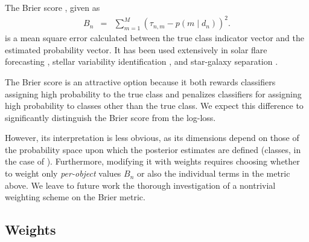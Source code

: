 The Brier score \cite{brier_verification_1950}, given as
\begin{eqnarray}
  \label{eq:brier}
B_{n} &=& \sum_{m=1}^{M}(\tau_{n, m}-p(m \mid d_{n}))^{2}.
\end{eqnarray}
is a mean square error calculated between the true class indicator vector and the estimated probability vector.
It has been used extensively in solar flare forecasting \cite{crown_validation, mays_ensemble_2015, florios_forecasting_2018}, stellar variability identification \citep{richards_construction_2012, armstrong_k2_2016}, and star-galaxy separation \citep{kim_hybrid_2015}.

The Brier score is an attractive option because it both rewards classifiers assigning high probability to the true class and penalizes classifiers for assigning high probability to classes other than the true class.
We expect this difference to significantly distinguish the Brier score from the log-loss.

However, its interpretation is less obvious, as its dimensions depend on those of the probability space upon which the posterior estimates are defined (classes, in the case of \plasticc).
Furthermore, modifying it with weights requires choosing whether to weight only \textit{per-object} values $B_{n}$ or also the individual terms in the metric above.
We leave to future work the thorough investigation of a nontrivial weighting scheme on the Brier metric.


%

\subsection{Weights}
\label{sec:weights}


